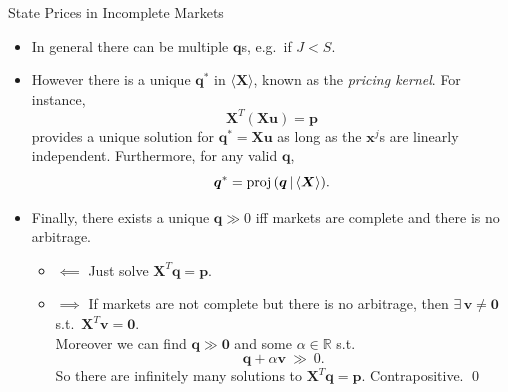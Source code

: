 \documentclass[aspectratio=1610]{beamer}
\newcommand{\st}{s.t.\ }
\newcommand{\bb}{\mathbb}
\begin{document}
\begin{frame}{State Prices in Incomplete Markets}
\begin{itemize}
  \item In general there can be multiple $\bm q$s, e.g.\ if $J<S$.
  \item However there is a unique $\bm q^*$ in $\langle\bm X\rangle$, known as the {\em pricing kernel}. For  instance,
  \begin{equation}
    \bm X^T(\bm X\bm u) = \bm p
  \end{equation}
  provides a unique solution for $\bm q^*=\bm{Xu}$ as long as the $\bm x^j$s are linearly independent. Furthermore, for any valid $\bm q$,
  \begin{equation}
    \bm q^* = \text{proj\,}(\bm q \, \vert\, \langle \bm X\rangle).
  \end{equation}

  \item Finally, there exists a unique $\bm q\gg0$ iff markets are complete and there is no arbitrage.
  \begin{itemize}
    \item $\impliedby$ Just solve $\bm X^T\bm q = \bm p$.
    \item $\implies$ If markets are not complete but there is no arbitrage, then $\exists\, \bm v \neq \bm 0$ \st $\bm X^T\bm v = \bm 0$.
    \\ Moreover we can find $\bm q\gg \bm 0$ and some $\alpha\in\bb R$ \st
    $$\bm q + \alpha \bm v \ \gg \ 0.$$
    So there are infinitely many solutions to $\bm X^T\bm q = \bm p$. Contrapositive. \qed
  \end{itemize}
\end{itemize}
\end{frame}
\end{document}
